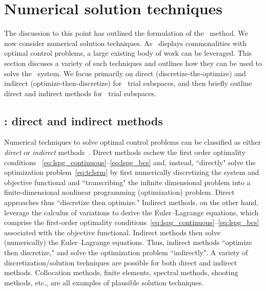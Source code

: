 \section{Numerical solution techniques}\label{sec:numerical_techniques}
The discussion to this point has outlined the formulation of the \methodAcronym\ method. We now consider numerical solution techniques. 
As \methodAcronym\ displays commonalities with optimal
control problems, a large existing body of work can be leveraged. This section
discuses a variety of such techniques and outlines how they can be used to
solve the \methodAcronym\ system. We focus primarily on 
direct (discretize-the-optimize) and indirect (optimize-then-discretize) for \spatialAcronym\ trial subspaces, 
and then briefly outline direct and indirect methods for \spaceTimeAcronym\ trial subspaces. 

\subsection{\spatialAcronym: direct and indirect methods}
Numerical techniques to
solve optimal control problems can be classified as either
\textit{direct} or \textit{indirect}
methods~\cite{conway_optimalcontrolreview}.  Direct methods eschew the first order optimality conditions
~\eqref{eq:lspg_continuous}--\eqref{eq:lspg_bcs} and, instead, ``directly" solve the optimization problem~\eqref{eq:tclsrm} by first
numerically discretizing the system and objective functional and ``transcribing"
the infinite dimensional problem into a finite-dimensional nonlinear
programming (optimization) problem. Direct approaches thus ``discretize then optimize."
Indirect methods, on the other hand, leverage the calculus of variations to
derive the Euler--Lagrange equations, which comprise the first-order
optimality conditions~\eqref{eq:lspg_continuous}--\eqref{eq:lspg_bcs} associated with the objective 
functional. Indirect methods then solve (numerically) the Euler--Lagrange equations. Thus, indirect methods ``optimize then discretize," and 
solve the optimization problem
``indirectly". A variety of discretization/solution techniques are possible for both direct and indirect methods. Collocation methods,
finite elements, spectral methods, shooting methods, etc., are all examples of
plausible solution techniques.  

